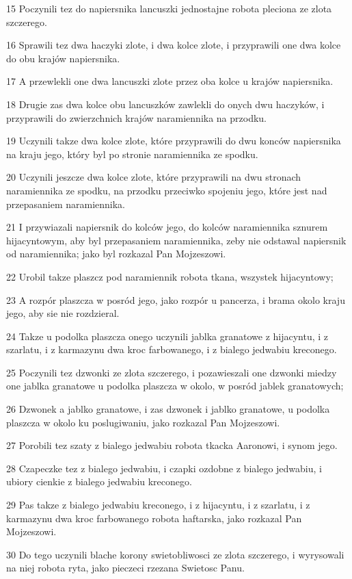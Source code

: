 \par 15 Poczynili tez do napiersnika lancuszki jednostajne robota pleciona ze zlota szczerego.
\par 16 Sprawili tez dwa haczyki zlote, i dwa kolce zlote, i przyprawili one dwa kolce do obu krajów napiersnika.
\par 17 A przewlekli one dwa lancuszki zlote przez oba kolce u krajów napiersnika.
\par 18 Drugie zas dwa kolce obu lancuszków zawlekli do onych dwu haczyków, i przyprawili do zwierzchnich krajów naramiennika na przodku.
\par 19 Uczynili takze dwa kolce zlote, które przyprawili do dwu konców napiersnika na kraju jego, który byl po stronie naramiennika ze spodku.
\par 20 Uczynili jeszcze dwa kolce zlote, które przyprawili na dwu stronach naramiennika ze spodku, na przodku przeciwko spojeniu jego, które jest nad przepasaniem naramiennika.
\par 21 I przywiazali napiersnik do kolców jego, do kolców naramiennika sznurem hijacyntowym, aby byl przepasaniem naramiennika, zeby nie odstawal napiersnik od naramiennika; jako byl rozkazal Pan Mojzeszowi.
\par 22 Urobil takze plaszcz pod naramiennik robota tkana, wszystek hijacyntowy;
\par 23 A rozpór plaszcza w posród jego, jako rozpór u pancerza, i brama okolo kraju jego, aby sie nie rozdzieral.
\par 24 Takze u podolka plaszcza onego uczynili jablka granatowe z hijacyntu, i z szarlatu, i z karmazynu dwa kroc farbowanego, i z bialego jedwabiu kreconego.
\par 25 Poczynili tez dzwonki ze zlota szczerego, i pozawieszali one dzwonki miedzy one jablka granatowe u podolka plaszcza w okolo, w posród jablek granatowych;
\par 26 Dzwonek a jablko granatowe, i zas dzwonek i jablko granatowe, u podolka plaszcza w okolo ku poslugiwaniu, jako rozkazal Pan Mojzeszowi.
\par 27 Porobili tez szaty z bialego jedwabiu robota tkacka Aaronowi, i synom jego.
\par 28 Czapeczke tez z bialego jedwabiu, i czapki ozdobne z bialego jedwabiu, i ubiory cienkie z bialego jedwabiu kreconego.
\par 29 Pas takze z bialego jedwabiu kreconego, i z hijacyntu, i z szarlatu, i z karmazynu dwa kroc farbowanego robota haftarska, jako rozkazal Pan Mojzeszowi.
\par 30 Do tego uczynili blache korony swietobliwosci ze zlota szczerego, i wyrysowali na niej robota ryta, jako pieczeci rzezana Swietosc Panu.
